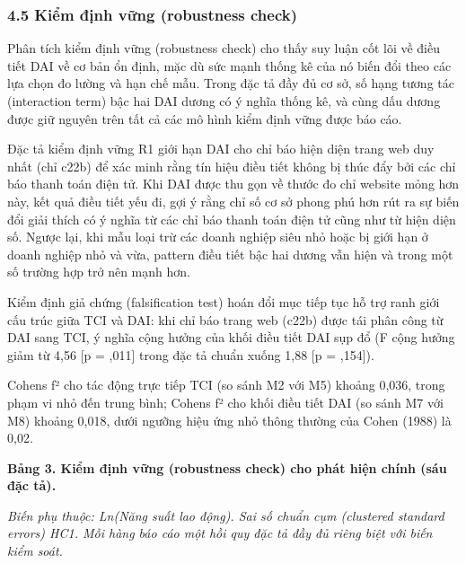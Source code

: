 \documentclass[12pt,a4paper]{article}
\begin{document}
\hypertarget{45-kiux1ec3m-ux111ux1ecbnh-vux1eefng-robustness-check}{%
\subsubsection{4.5 Kiểm định vững (robustness
check)}\label{45-kiux1ec3m-ux111ux1ecbnh-vux1eefng-robustness-check}}

Phân tích kiểm định vững (robustness check) cho thấy suy luận cốt lõi về
điều tiết DAI về cơ bản ổn định, mặc dù sức mạnh thống kê của nó biến
đổi theo các lựa chọn đo lường và hạn chế mẫu. Trong đặc tả đầy đủ cơ
sở, số hạng tương tác (interaction term) bậc hai DAI dương có ý nghĩa
thống kê, và cùng dấu dương được giữ nguyên trên tất cả các mô hình kiểm
định vững được báo cáo.

Đặc tả kiểm định vững R1 giới hạn DAI cho chỉ báo hiện diện trang web
duy nhất (chỉ c22b) để xác minh rằng tín hiệu điều tiết không bị thúc
đẩy bởi các chỉ báo thanh toán điện tử. Khi DAI được thu gọn về thước đo
chỉ website mỏng hơn này, kết quả điều tiết yếu đi, gợi ý rằng chỉ số cơ
sở phong phú hơn rút ra sự biến đổi giải thích có ý nghĩa từ các chỉ báo
thanh toán điện tử cũng như từ hiện diện số. Ngược lại, khi mẫu loại trừ
các doanh nghiệp siêu nhỏ hoặc bị giới hạn ở doanh nghiệp nhỏ và vừa,
pattern điều tiết bậc hai dương vẫn hiện và trong một số trường hợp trở
nên mạnh hơn.

Kiểm định giả chứng (falsification test) hoán đổi mục tiếp tục hỗ trợ
ranh giới cấu trúc giữa TCI và DAI: khi chỉ báo trang web (c22b) được
tái phân công từ DAI sang TCI, ý nghĩa cộng hưởng của khối điều tiết DAI
sụp đổ (F cộng hưởng giảm từ 4,56 {[}p = ,011{]} trong đặc tả chuẩn
xuống 1,88 {[}p = ,154{]}).

Cohen\textquotesingle s f² cho tác động trực tiếp TCI (so sánh M2 với
M5) khoảng 0,036, trong phạm vi nhỏ đến trung bình;
Cohen\textquotesingle s f² cho khối điều tiết DAI (so sánh M7 với M8)
khoảng 0,018, dưới ngưỡng hiệu ứng nhỏ thông thường của Cohen (1988) là
0,02.

\textbf{Bảng 3. Kiểm định vững (robustness check) cho phát hiện chính
(sáu đặc tả).}

\emph{Biến phụ thuộc: Ln(Năng suất lao động). Sai số chuẩn cụm
(clustered standard errors) HC1. Mỗi hàng báo cáo một hồi quy đặc tả đầy
đủ riêng biệt với biến kiểm soát.}
\end{document}
